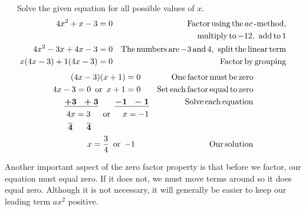 \begin{example}~~~Solve the given equation for all possible values of $x$.
  \begin{eqnarray*}
    4 x^2 + x - 3 = 0 &  & \tmop{Factor} \tmop{using} \tmop{the} ac
    \tmop{-method},\\
		&& \tmop{~~~multiply} \tmop{to} - 12, \tmop{~add} \tmop{to} 1\\
    4 x^2 - 3 x + 4 x - 3 = 0 &  & \tmop{The} \tmop{numbers} \tmop{are} - 3
    \tmop{and} 4, \tmop{~split} \tmop{the} \tmop{linear} \tmop{term}\\
    x (4 x - 3) + 1 (4 x - 3) = 0 &  & \tmop{Factor} \tmop{by}
    \tmop{grouping}%
  \end{eqnarray*}
  \begin{eqnarray*}
    (4 x - 3) (x + 1) = 0~~~ &  & \operatorname{One} \operatorname{factor} \operatorname{must} \operatorname{be}
    \operatorname{zero}\\
    4 x - 3 = 0 \operatorname{~or~} x + 1 = 0~~~ &  & \operatorname{Set} \operatorname{each} \operatorname{factor}
    \operatorname{equal} \operatorname{to} \operatorname{zero}\\
    \boldsymbol{\underline{+ 3 ~~+ 3} ~~~~~~ \underline{- 1 ~~- 1}} &  & \operatorname{Solve} \operatorname{each}
    \operatorname{equation}\\
    4 x = 3 \operatorname{~~~~or~~~~} x = - 1 &  & \\
    \boldsymbol{\overline{4} ~~~~~ \overline{4}}~~~~~~~~~~~~~~~~~~~~~  &  & \\
    x = \frac{3}{4} \operatorname{~or~} - 1~~~~~ &  & \operatorname{Our} \operatorname{solution}
  \end{eqnarray*}
\end{example}
 
Another important aspect of the zero factor property is that before we factor, our
equation must equal zero. If it does not, we must move terms around so it does
equal zero. Although it is not necessary, it will generally be easier to keep our leading term $ax^2$ positive.

